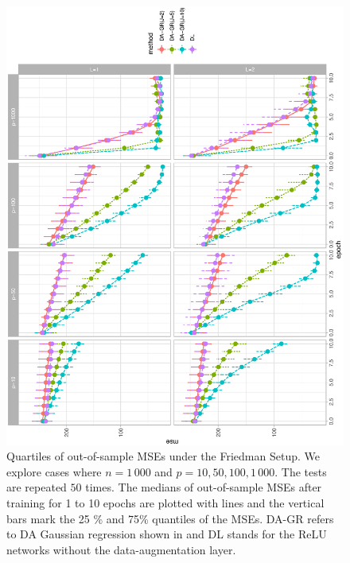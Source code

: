 \documentclass[ba]{imsart}
\numberwithin{equation}{section}
\theoremstyle{plain}
\begin{document}
\begin{figure}[!ht]
\begin{center}
\includegraphics[height=0.95\textwidth,angle=270]{fig/friedman_mse_1000_adam.eps}
\vspace{-0.15in}
\end{center}
\caption{Quartiles of out-of-sample MSEs under the Friedman Setup. We explore cases where  $n=1\,000$ and $p=10, 50, 100, 1\,000$. The tests are repeated $50$ times. The medians of out-of-sample MSEs after  training for 1 to 10 epochs are plotted with lines and the vertical bars mark the 25 \% and 75\% quantiles of the MSEs. DA-GR refers to  DA Gaussian regression shown in  and DL stands for the ReLU networks without the data-augmentation layer.} \label{fig:friedman}
\vspace{-0.15in}
\end{figure}
\end{document}
